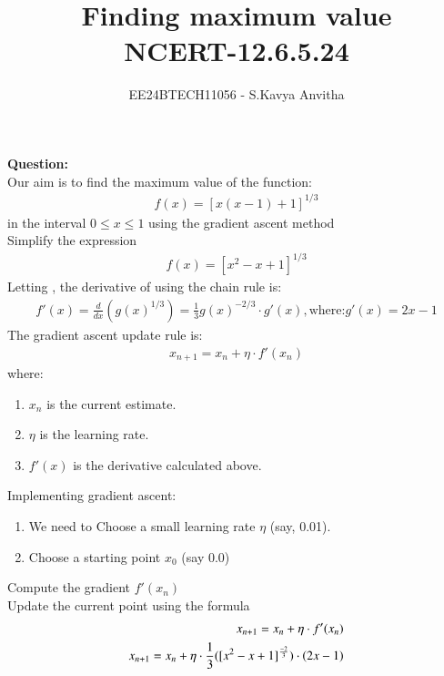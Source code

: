 \documentclass[journal]{IEEEtran}
\begin{document}

\vspace{3cm}

\title{Finding maximum value\\NCERT-12.6.5.24}
\author{EE24BTECH11056 - S.Kavya Anvitha}
\maketitle
\bigskip

\renewcommand{\thefigure}{\theenumi}
\renewcommand{\thetable}{\theenumi}
\textbf{Question:}\\
Our aim is to find the maximum value of the function:
\begin{align}
    f(x) = \left[ x(x-1) + 1 \right]^{1/3}
\end{align}
in the interval $0\leq x \leq 1$ using the gradient ascent method\\
Simplify the expression 
\begin{align}
    f(x) = \left[ x^2 - x + 1 \right]^{1/3}
\end{align}
Letting , the derivative of  using the chain rule is:
\begin{align}
f'(x) = \frac{d}{dx} \left( g(x)^{1/3} \right) = \frac{1}{3}g(x)^{-2/3} \cdot g'(x),
\text{where:}
g'(x) = 2x - 1
\end{align}
The gradient ascent update rule is:
\begin{align}
x_{n+1} = x_n + \eta \cdot f'(x_n)
\end{align}
where:\\
\begin{enumerate}
    \item $x_n$ is the current estimate.
    \item $\eta$ is the learning rate.
    \item $f'(x) $ is the derivative calculated above.
\end{enumerate}
Implementing gradient ascent:
\begin{enumerate}
    \item We need to Choose a small learning rate $\eta$ (say, 0.01).
    \item Choose a starting point $x_0$ (say 0.0)
\end{enumerate}
Compute the gradient $f'(x_n)$\\
Update the current point using the formula 
\begin{align}
x_{n+1} = x_n + \eta \cdot f'(x_n)\\
x_{n+1} = x_n + \eta \cdot \frac{1}{3}([x^2-x+1]^{\frac{-2}{3}})\cdot\left(2x-1\right)
\end{align}
\end{document}
